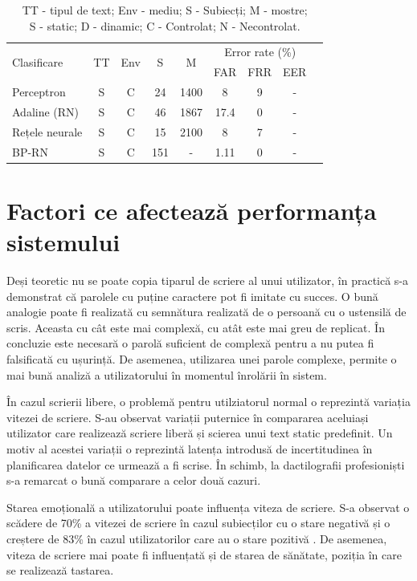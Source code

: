 \documentclass[9pt,shortpaper,twoside,web]{ieeecolor}
\begin{document}
\begin{table}[H]
	\begin{tabular}[c]{lcccccccc}
	\hline
	\multirow{2}{*}{Clasificare} & \multirow{2}{*}{TT} & \multirow{2}{*}{Env} & \multirow{2}{*}{S} & \multirow{2}{*}{M} & \multicolumn{3}{c}{Error rate (\%)} \\
	\cline{6-8}
            &    &     &   &   &  FAR & FRR & EER \\
	\hline
	Perceptron	      & S & C &  24 & 1400 &   8   &  9 & - \\
	Adaline (RN)	  & S & C &  46 & 1867 & 17.4  &  0 & - \\
	Rețele neurale	  & S & C &  15 & 2100 &  8    &  7 & - \\
	BP-RN			  & S & C & 151 &    - &  1.11 &  0 & - \\
	
	\hline
	\end{tabular}
	
\caption{
TT - tipul de text; Env - mediu; S - Subiecți; M - mostre;
\\
S - static; D - dinamic; C - Controlat; N - Necontrolat.}
\end{table}


\section{Factori ce afectează performanța sistemului}
	Deși teoretic nu se poate copia tiparul de scriere al unui utilizator, în practică s-a demonstrat că parolele cu puține caractere pot fi imitate cu succes. O bună analogie poate fi realizată cu semnătura realizată de o persoană cu o ustensilă de scris. Aceasta cu cât este mai complexă, cu atât este mai greu de replicat. În concluzie este necesară o parolă suficient de complexă pentru a nu putea fi falsificată cu ușurință. De asemenea, utilizarea unei parole complexe, permite o mai bună analiză a utilizatorului în momentul înrolării în sistem. 
	
	În cazul scrierii libere, o problemă pentru utilziatorul normal o reprezintă variația vitezei de scriere. S-au observat variații puternice în compararea aceluiași utilizator care realizează scriere liberă și scierea unui text static predefinit. Un motiv al acestei variații o reprezintă latența introdusă de incertitudinea în planificarea datelor ce urmează a fi scrise. În schimb, la dactilografii profesioniști s-a remarcat o bună comparare a celor două cazuri\cite{b3}.
	
	Starea emoțională a utilizatorului poate influența viteza de scriere. S-a observat o scădere de 70\% a vitezei de scriere în cazul subiecților cu o stare negativă și o creștere de 83\% în cazul utilizatorilor care au o stare pozitivă \cite{b3}. De asemenea, viteza de scriere mai poate fi influențată și de starea de sănătate, poziția în care se realizează tastarea.
\end{document}
